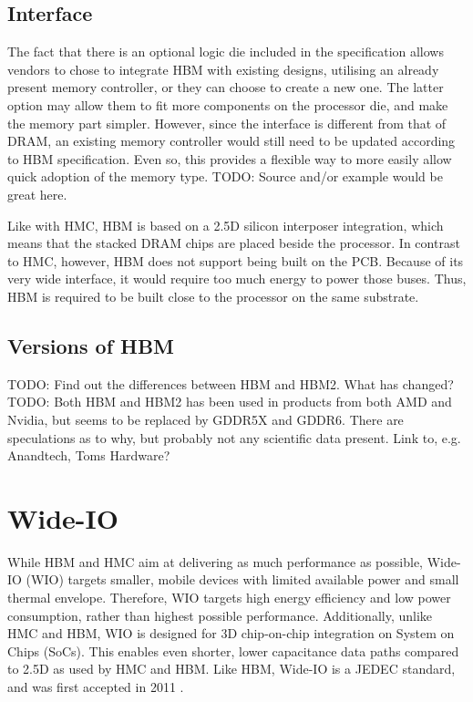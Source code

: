 \subsection{Interface}
The fact that there is an optional logic die included in the specification allows vendors to chose to integrate HBM with existing designs, utilising an already present memory controller, or they can choose to create a new one. The latter option may allow them to fit more components on the processor die, and make the memory part simpler. However, since the interface is different from that of DRAM, an existing memory controller would still need to be updated according to HBM specification. Even so, this provides a flexible way to more easily allow quick adoption of the memory type. TODO: Source and/or example would be great here.
\bigskip

Like with HMC, HBM is based on a 2.5D silicon interposer integration, which means that the stacked DRAM chips are placed beside the processor. In contrast to HMC, however, HBM does not support being built on the PCB. Because of its very wide interface, it would require too much energy to power those buses. Thus, HBM is required to be built close to the processor on the same substrate.

\subsection{Versions of HBM}
TODO: Find out the differences between HBM and HBM2. What has changed? 
TODO: Both HBM and HBM2 has been used in products from both AMD and Nvidia, but seems to be replaced by GDDR5X and GDDR6. There are speculations as to why, but probably not any scientific data present. Link to, e.g. Anandtech, Toms Hardware?


\section{Wide-IO}
While HBM and HMC aim at delivering as much performance as possible, Wide-IO (WIO) targets smaller, mobile devices with limited available power and small thermal envelope. Therefore, WIO targets high energy efficiency and low power consumption, rather than highest possible performance. Additionally, unlike HMC and HBM, WIO is designed for 3D chip-on-chip integration on System on Chips (SoCs). This enables even shorter, lower capacitance data paths compared to 2.5D as used by HMC and HBM. Like HBM, Wide-IO is a JEDEC standard, and was first accepted in 2011 \cite{standard2011wide}. 

